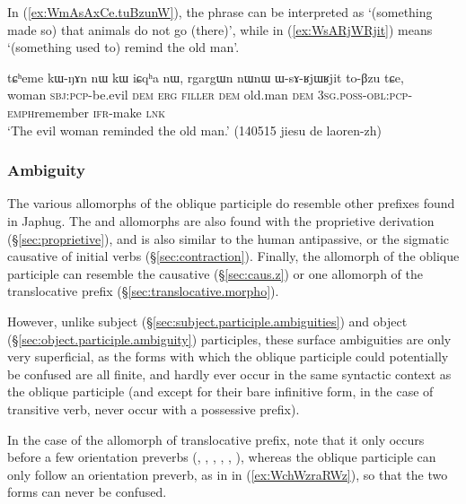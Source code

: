 In (\ref{ex:WmAsAxCe.tuBzunW}), the phrase  can be interpreted as `(something made so) that animals do not go (there)', while in (\ref{ex:WsARjWRjit})  means `(something used to) remind the old man'. 

\begin{exe}
\ex \label{ex:WsARjWRjit}
\gll tɕʰeme kɯ-ŋɤn nɯ kɯ iɕqʰa nɯ, rgargɯn nɯnɯ ɯ-sɤ-ʁjɯ\redp{}ʁjit to-βzu tɕe, \\
woman \textsc{sbj}:\textsc{pcp}-be.evil \textsc{dem} \textsc{erg} \textsc{filler} \textsc{dem} old.man \textsc{dem} \textsc{3sg}.\textsc{poss}-\textsc{obl}:\textsc{pcp}-\textsc{emph}\redp{}remember \textsc{ifr}-make \textsc{lnk} \\
\glt `The evil woman reminded the old man.' (140515 jiesu de laoren-zh)
\end{exe}


\subsubsection{Ambiguity} \label{sec:oblique.participle.ambiguity}
The various allomorphs of the oblique participle do resemble other prefixes found in Japhug. The  and  allomorphs are also found with the proprietive derivation (§\ref{sec:proprietive}), and  is also similar to the human antipassive, or the sigmatic causative of  initial verbs (§\ref{sec:contraction}). Finally, the  allomorph of the oblique participle can resemble the causative (§\ref{sec:caus.z}) or one allomorph of the translocative prefix (§\ref{sec:translocative.morpho}).

However, unlike subject (§\ref{sec:subject.participle.ambiguities}) and object (§\ref{sec:object.participle.ambiguity}) participles, these surface ambiguities are only very superficial, as the forms with which the oblique participle could potentially be confused are all finite, and hardly ever occur in the same syntactic context as the oblique participle (and except for their bare infinitive form, in the case of transitive verb, never occur with a possessive prefix). 

In the case of the  allomorph of translocative prefix, note that it only occurs before a few orientation preverbs (, , , , , ), whereas the oblique participle  can only follow an orientation preverb, as in  in (\ref{ex:WchWzraRWz}), so that the two forms can never be confused.

